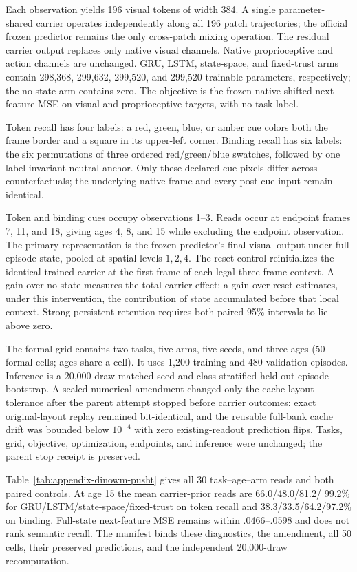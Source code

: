 Each observation yields 196 visual tokens of width 384.  A single
parameter-shared carrier operates independently along all 196 patch
trajectories; the official frozen predictor remains the only cross-patch
mixing operation.  The residual carrier output replaces only native visual
channels.  Native proprioceptive and action channels are unchanged.  GRU,
LSTM, state-space, and fixed-trust arms contain 298,368, 299,632, 299,520, and
299,520 trainable parameters, respectively; the no-state arm contains zero.
The objective is
the frozen native shifted next-feature MSE on visual and proprioceptive targets,
with no task label.

Token recall has four labels: a red, green, blue, or amber cue colors both the
frame border and a square in its upper-left corner.  Binding recall has six
labels: the six permutations of three ordered red/green/blue swatches, followed
by one label-invariant neutral anchor.  Only these declared cue pixels differ
across counterfactuals; the underlying native frame and every post-cue input
remain identical.

Token and binding cues occupy observations 1--3.  Reads occur at endpoint
frames 7, 11, and 18, giving ages 4, 8, and 15 while excluding the endpoint
observation.  The primary representation is the frozen predictor's final visual
output under full episode state, pooled at spatial levels $1,2,4$.  The reset
control reinitializes the identical trained carrier at the first frame of each
legal three-frame context.  A gain over no state measures the total carrier
effect; a gain over reset estimates, under this intervention, the contribution
of state accumulated before that local context.  Strong persistent retention
requires both paired 95\% intervals to lie above zero.

The formal grid contains two tasks, five arms, five seeds, and three ages (50
formal cells; ages share a cell).  It uses 1,200 training and 480 validation
episodes.  Inference is a 20,000-draw matched-seed and class-stratified
held-out-episode bootstrap.  A sealed numerical amendment changed only the
cache-layout tolerance after the parent attempt stopped before carrier
outcomes: exact original-layout replay remained bit-identical, and the reusable
full-bank cache drift was bounded below $10^{-4}$ with zero existing-readout
prediction flips.  Tasks, grid, objective, optimization, endpoints, and
inference were unchanged; the parent stop receipt is preserved.

Table~\ref{tab:appendix-dinowm-pusht} gives all 30 task--age--arm reads and both
paired controls.  At age 15 the mean carrier-prior reads are 66.0/48.0/81.2/
99.2\% for GRU/LSTM/state-space/fixed-trust on token recall and
38.3/33.5/64.2/97.2\% on binding.  Full-state next-feature MSE remains within
.0466--.0598 and does not rank semantic recall.  The manifest binds these
diagnostics, the amendment, all 50 cells, their preserved predictions, and the
independent 20,000-draw recomputation.

